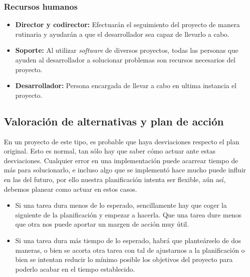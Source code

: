 \subsubsection{Recursos humanos}

\begin{itemize}
 \item \textbf{Director y codirector: } Efectuarán el seguimiento del proyecto de manera rutinaria y ayudarán a que el desarrollador sea capaz de llevarlo a cabo. 
 \item \textbf{Soporte: } Al utilizar \textit{software} de diversos proyectos, todas las personas que ayuden al desarrollador a solucionar problemas son recursos necesarios del proyecto.
 \item \textbf{Desarrollador: } Persona encargada de llevar a cabo en ultima instancia el proyecto.
\end{itemize}

\subsection{Valoración de alternativas y plan de acción}

En un proyecto de este tipo, es probable que haya desviaciones respecto el plan original. Esto es normal, tan sólo hay que saber cómo actuar ante estas desviaciones. Cualquier error en una implementación puede acarrear tiempo de más para solucionarlo, e incluso algo que se implementó hace mucho puede influir en las del futuro, por ello nuestra planificación intenta ser flexible, aún así, debemos planear como actuar en estos casos.

\begin{itemize}
 \item Si una tarea dura menos de lo esperado, sencillamente hay que coger la siguiente de la planificación y empezar a hacerla. Que una tarea dure menos que otra nos puede aportar un margen de acción muy útil.
 \item Si una tarea dura más tiempo de lo esperado, habrá que planteárselo de dos maneras, o bien se acorta otra tarea con tal de ajustarnos a la planificación o bien se intentan reducir lo mínimo posible los objetivos del proyecto para poderlo acabar en el tiempo establecido.
\end{itemize}

